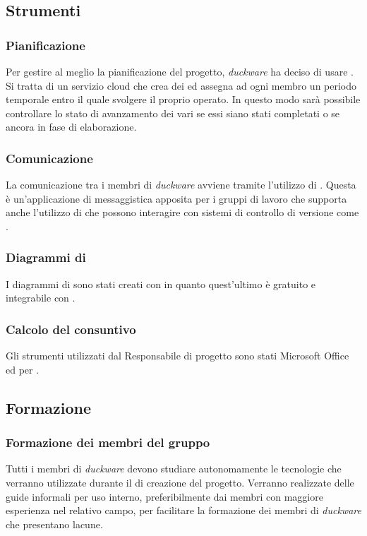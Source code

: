 \subsection{Strumenti}

\subsubsection{Pianificazione}
Per gestire al meglio la pianificazione del progetto, \emph{duckware} ha deciso di usare . Si tratta di un servizio cloud che crea dei  ed assegna ad ogni membro un periodo temporale entro il quale svolgere il proprio operato. In questo modo sarà possibile controllare lo stato di avanzamento dei vari  se essi siano stati completati o se ancora in fase di elaborazione.

\subsubsection{Comunicazione}
La comunicazione tra i membri di \emph{duckware} avviene tramite l’utilizzo di . Questa è un’applicazione di messaggistica apposita per i gruppi di lavoro che supporta anche l’utilizzo di  che possono interagire con sistemi di controllo di versione come .

\subsubsection{Diagrammi di }
I diagrammi di  sono stati creati con  in quanto quest’ultimo è gratuito e integrabile con .

\subsubsection{Calcolo del consuntivo}
Gli strumenti utilizzati dal Responsabile di progetto sono stati Microsoft Office  ed  per .

\subsection{Formazione}
\subsubsection{Formazione dei membri del gruppo}
Tutti i membri di \emph{duckware} devono studiare autonomamente le tecnologie che verranno utilizzate durante il  di creazione del progetto. Verranno realizzate delle guide informali per uso interno, preferibilmente dai membri con maggiore esperienza nel relativo campo, per facilitare la formazione dei membri di \emph{duckware} che presentano lacune.

